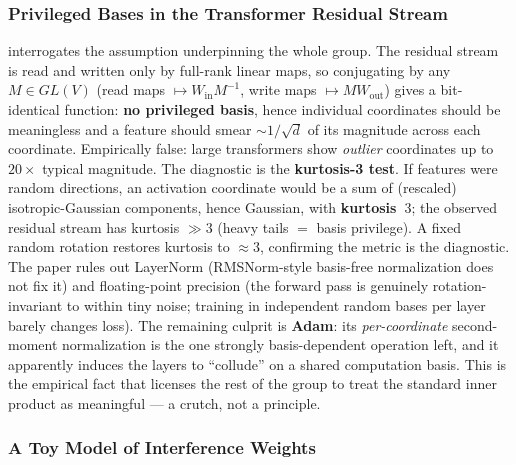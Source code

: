\subsubsection*{Privileged Bases in the Transformer Residual Stream}

\textcite{privileged-bases-residual-stream} interrogates the assumption underpinning the whole group. The residual stream is read and written only by full-rank linear maps, so conjugating by any $M\in GL(V)$ (read maps $\mapsto W_{\text{in}}M^{-1}$, write maps $\mapsto MW_{\text{out}}$) gives a bit-identical function: \textbf{no privileged basis}, hence individual coordinates should be meaningless and a feature should smear $\sim 1/\sqrt{d}$ of its magnitude across each coordinate. Empirically false: large transformers show \emph{outlier} coordinates up to $20\times$ typical magnitude. The diagnostic is the \textbf{kurtosis-3 test}. If features were random directions, an activation coordinate would be a sum of (rescaled) isotropic-Gaussian components, hence Gaussian, with \textbf{kurtosis~$3$}; the observed residual stream has kurtosis $\gg 3$ (heavy tails $=$ basis privilege). A fixed random rotation restores kurtosis to $\approx 3$, confirming the metric is the diagnostic. The paper rules out LayerNorm (RMSNorm-style basis-free normalization does not fix it) and floating-point precision (the forward pass is genuinely rotation-invariant to within tiny noise; training in independent random bases per layer barely changes loss). The remaining culprit is \textbf{Adam}: its \emph{per-coordinate} second-moment normalization is the one strongly basis-dependent operation left, and it apparently induces the layers to ``collude'' on a shared computation basis. This is the empirical fact that licenses the rest of the group to treat the standard inner product as meaningful --- a crutch, not a principle.

\subsubsection*{A Toy Model of Interference Weights}

